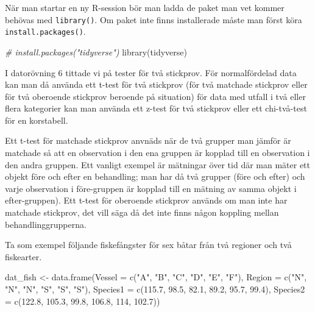 \documentclass[
]{book}
\newenvironment{Shaded}{\begin{snugshade}}{\end{snugshade}}
\newcommand{\AttributeTok}[1]{\textcolor[rgb]{0.77,0.63,0.00}{#1}}
\newcommand{\CommentTok}[1]{\textcolor[rgb]{0.56,0.35,0.01}{\textit{#1}}}
\newcommand{\DecValTok}[1]{\textcolor[rgb]{0.00,0.00,0.81}{#1}}
\newcommand{\FloatTok}[1]{\textcolor[rgb]{0.00,0.00,0.81}{#1}}
\newcommand{\FunctionTok}[1]{\textcolor[rgb]{0.00,0.00,0.00}{#1}}
\newcommand{\NormalTok}[1]{#1}
\newcommand{\OtherTok}[1]{\textcolor[rgb]{0.56,0.35,0.01}{#1}}
\newcommand{\StringTok}[1]{\textcolor[rgb]{0.31,0.60,0.02}{#1}}
\theoremstyle{definition}
\theoremstyle{definition}
\theoremstyle{definition}
\theoremstyle{definition}
\theoremstyle{remark}
\begin{document}
När man startar en ny R-session bör man ladda de paket man vet kommer behövas med \texttt{library()}. Om paket inte finns installerade måste man först köra \texttt{install.packages()}.

\begin{Shaded}
\begin{Highlighting}[]
\CommentTok{\# install.packages("tidyverse")}
\FunctionTok{library}\NormalTok{(tidyverse)}
\end{Highlighting}
\end{Shaded}

I datorövning 6 tittade vi på tester för två stickprov. För normalfördelad data kan man då använda ett t-test för två stickprov (för två matchade stickprov eller för två oberoende stickprov beroende på situation) för data med utfall i två eller flera kategorier kan man använda ett z-test för två stickprov eller ett chi-två-test för en korstabell.

Ett t-test för matchade stickprov anvnäds när de två grupper man jämför är matchade så att en observation i den ena gruppen är kopplad till en observation i den andra gruppen. Ett vanligt exempel är mätningar över tid där man mäter ett objekt före och efter en behandling; man har då två grupper (före och efter) och varje observation i före-gruppen är kopplad till en mätning av samma objekt i efter-gruppen). Ett t-test för oberoende stickprov används om man inte har matchade stickprov, det vill säga då det inte finns någon koppling mellan behandlinggrupperna.

Ta som exempel följande fiskefångster för sex båtar från två regioner och två fiskearter.

\begin{Shaded}
\begin{Highlighting}[]
\NormalTok{dat\_fish }\OtherTok{\textless{}{-}} \FunctionTok{data.frame}\NormalTok{(}\AttributeTok{Vessel =} \FunctionTok{c}\NormalTok{(}\StringTok{"A"}\NormalTok{, }\StringTok{"B"}\NormalTok{, }\StringTok{"C"}\NormalTok{, }\StringTok{"D"}\NormalTok{, }\StringTok{"E"}\NormalTok{, }\StringTok{"F"}\NormalTok{),}
                       \AttributeTok{Region =} \FunctionTok{c}\NormalTok{(}\StringTok{"N"}\NormalTok{, }\StringTok{"N"}\NormalTok{, }\StringTok{"N"}\NormalTok{, }\StringTok{"S"}\NormalTok{, }\StringTok{"S"}\NormalTok{, }\StringTok{"S"}\NormalTok{),}
                       \AttributeTok{Species1 =} \FunctionTok{c}\NormalTok{(}\FloatTok{115.7}\NormalTok{, }\FloatTok{98.5}\NormalTok{, }\FloatTok{82.1}\NormalTok{, }\FloatTok{89.2}\NormalTok{, }\FloatTok{95.7}\NormalTok{, }\FloatTok{99.4}\NormalTok{),}
                       \AttributeTok{Species2 =} \FunctionTok{c}\NormalTok{(}\FloatTok{122.8}\NormalTok{, }\FloatTok{105.3}\NormalTok{, }\FloatTok{99.8}\NormalTok{, }\FloatTok{106.8}\NormalTok{, }\DecValTok{114}\NormalTok{, }\FloatTok{102.7}\NormalTok{))}
\end{Highlighting}
\end{Shaded}
\end{document}
